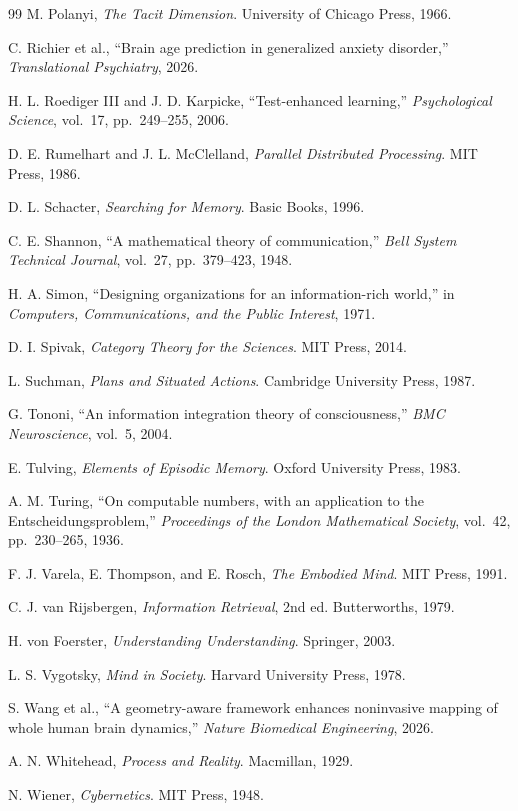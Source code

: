 \documentclass[12pt,oneside]{book}
\theoremstyle{plain}
\theoremstyle{definition}
\theoremstyle{plain}
\begin{document}
\begin{thebibliography}{99}
M. Polanyi,
\textit{The Tacit Dimension}.
University of Chicago Press, 1966.

C. Richier et al.,
``Brain age prediction in generalized anxiety disorder,''
\textit{Translational Psychiatry}, 2026.

H. L. Roediger III and J. D. Karpicke,
``Test-enhanced learning,''
\textit{Psychological Science}, vol.~17, pp.~249--255, 2006.

D. E. Rumelhart and J. L. McClelland,
\textit{Parallel Distributed Processing}.
MIT Press, 1986.

D. L. Schacter,
\textit{Searching for Memory}.
Basic Books, 1996.

C. E. Shannon,
``A mathematical theory of communication,''
\textit{Bell System Technical Journal}, vol.~27, pp.~379--423, 1948.

H. A. Simon,
``Designing organizations for an information-rich world,''
in \textit{Computers, Communications, and the Public Interest}, 1971.

D. I. Spivak,
\textit{Category Theory for the Sciences}.
MIT Press, 2014.

L. Suchman,
\textit{Plans and Situated Actions}.
Cambridge University Press, 1987.

G. Tononi,
``An information integration theory of consciousness,''
\textit{BMC Neuroscience}, vol.~5, 2004.

E. Tulving,
\textit{Elements of Episodic Memory}.
Oxford University Press, 1983.

A. M. Turing,
``On computable numbers, with an application to the Entscheidungsproblem,''
\textit{Proceedings of the London Mathematical Society}, vol.~42, pp.~230--265, 1936.

F. J. Varela, E. Thompson, and E. Rosch,
\textit{The Embodied Mind}.
MIT Press, 1991.

C. J. van Rijsbergen,
\textit{Information Retrieval}, 2nd ed.
Butterworths, 1979.

H. von Foerster,
\textit{Understanding Understanding}.
Springer, 2003.

L. S. Vygotsky,
\textit{Mind in Society}.
Harvard University Press, 1978.

S. Wang et al.,
``A geometry-aware framework enhances noninvasive mapping of whole human brain dynamics,''
\textit{Nature Biomedical Engineering}, 2026.

A. N. Whitehead,
\textit{Process and Reality}.
Macmillan, 1929.

N. Wiener,
\textit{Cybernetics}.
MIT Press, 1948.

\end{thebibliography}
\end{document}
